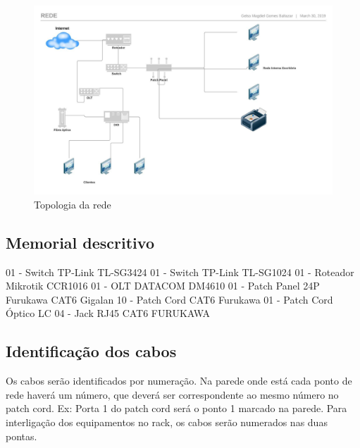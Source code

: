 \documentclass[	DIV=calc,%
paper=a4,%
fontsize=12pt,%
onecolumn]{scrartcl}	 					%
\begin{document}
	\begin{figure}
		\centering
		\includegraphics[width=\textwidth]{topologia}
		\caption{Topologia da rede}
		\label{topologia}
	\end{figure}
	
	
	\subsection{Memorial descritivo}
	
	01 - Switch TP-Link TL-SG3424
	01 - Switch TP-Link TL-SG1024
	01 - Roteador Mikrotik CCR1016
	01 - OLT DATACOM DM4610
	01 - Patch Panel 24P Furukawa CAT6 Gigalan
	10 - Patch Cord CAT6 Furukawa
	01 - Patch Cord Óptico LC
	04 - Jack RJ45 CAT6 FURUKAWA
	
	\subsection{Identificação dos cabos}
	Os cabos serão identificados por numeração. Na parede onde está cada ponto de rede haverá um número, que deverá ser correspondente ao mesmo número no patch cord. Ex: Porta 1 do patch cord será o ponto 1 marcado na parede.
	Para interligação dos equipamentos no rack, os cabos serão numerados nas duas pontas.
	
\end{document}
